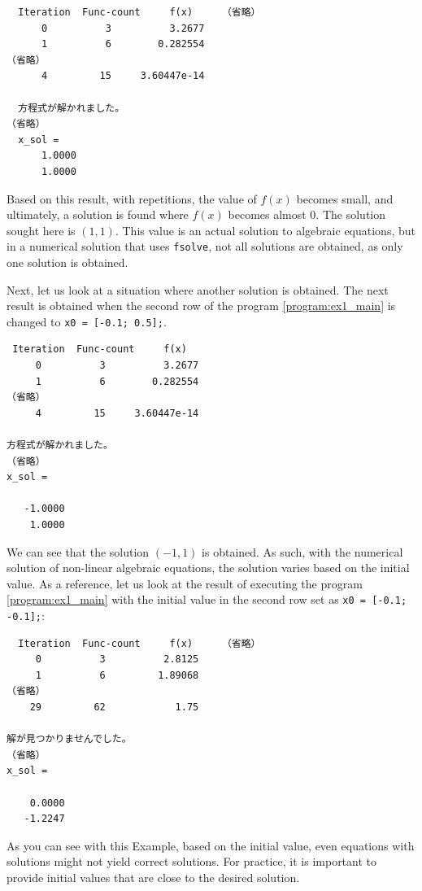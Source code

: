 \documentclass[graybox, envcountchap]{svmult}
\begin{document}
\begin{example}
\smallskip
\begin{execution}
\begin{verbatim}
  Iteration  Func-count     f(x)     （省略）
      0          3          3.2677
      1          6        0.282554
（省略）
      4         15     3.60447e-14

  方程式が解かれました。
（省略）
  x_sol =
      1.0000
      1.0000
\end{verbatim}
\end{execution}

Based on this result, with repetitions, the value of $f(x)$ becomes small, and ultimately, a solution is found where $f(x)$ becomes almost 0.
The solution sought here is $(1, 1)$. This value is an actual solution to algebraic equations, but in a numerical solution that uses \verb|fsolve|, not all solutions are obtained, as only one solution is obtained.

Next, let us look at a situation where another solution is obtained.
The next result is obtained when the second row of the program \nobreak\ref{program:ex1_main} is changed to \verb|x0 = [-0.1; 0.5];|.

\smallskip
\begin{execution}
\begin{verbatim}
 Iteration  Func-count     f(x)   
     0          3          3.2677
     1          6        0.282554
（省略）
     4         15     3.60447e-14

方程式が解かれました。
（省略）
x_sol =

   -1.0000
    1.0000
\end{verbatim}
\end{execution}

We can see that the solution $(-1, 1)$ is obtained.
As such, with the numerical solution of non-linear algebraic equations, the solution varies based on the initial value.
As a reference, let us look at the result of executing the program \nobreak\ref{program:ex1_main} with the initial value in the second row set as \verb|x0 = [-0.1; -0.1];|:

\smallskip
\begin{execution}
    \begin{verbatim}
  Iteration  Func-count     f(x)     （省略）
     0          3          2.8125
     1          6         1.89068
（省略）
    29         62            1.75

解が見つかりませんでした。
（省略）
x_sol =

    0.0000
   -1.2247
\end{verbatim}
\end{execution}

As you can see with this Example, based on the initial value, even equations with solutions might not yield correct solutions.
For practice, it is important to provide initial values that are close to the desired solution.
\end{example}
\end{document}
